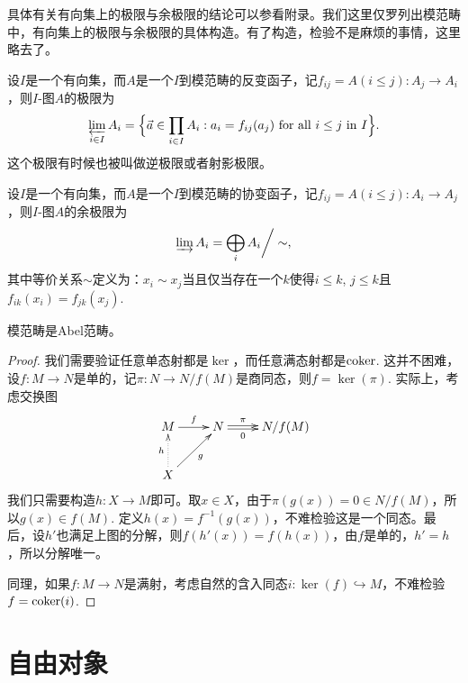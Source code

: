 \begin{para}[有向集上的极限与余极限]
具体有关有向集上的极限与余极限的结论可以参看附录。我们这里仅罗列出模范畴中，有向集上的极限与余极限的具体构造。有了构造，检验不是麻烦的事情，这里略去了。

设$I$是一个有向集，而$A$是一个$I$到模范畴的反变函子，记$f_{ij}=A(i\leq j):A_j\to A_i$，则$I$-图$A$的极限为
\[
	\varprojlim _{i\in I}A_{i}={\Big \{}{\vec {a}}\in \prod _{i\in I}A_{i}\;{:}\;a_{i}=f_{ij}(a_{j}){\text{ for all }}i\leq j{\text{ in }}I{\Big \}}.
\]
这个极限有时候也被叫做逆极限或者射影极限。

设$I$是一个有向集，而$A$是一个$I$到模范畴的协变函子，记$f_{ij}=A(i\leq j):A_i\to A_j$，则$I$-图$A$的余极限为
\[
	\varinjlim A_{i}=\bigoplus_{i}A_{i}{\bigg /}\sim,
\]
其中等价关系$\sim$定义为：$x_i\sim x_j$当且仅当存在一个$k$使得$i\leq k$, $j\leq k$且$f_{ik}(x_{i})=f_{jk}(x_{j})$.
\end{para}

\begin{thm}
模范畴是Abel范畴。
\end{thm}

\begin{proof}
我们需要验证任意单态射都是$\ker$，而任意满态射都是$\operatorname{coker}$. 这并不困难，设$f:M\to N$是单的，记$\pi:N\to N/f(M)$是商同态，则$f=\ker(\pi)$. 实际上，考虑交换图
\[
\begin{xy}
	\xymatrix{
		M\ar[r]^-{f}&N\ar@<0.3ex>[r]^-{\pi} \ar@<-0.3ex>[r]_-{0}&N/f(M)\\
		X\ar@{.>}[u]^-{h}\ar[ur]_-{g}
	}
\end{xy}
\]
我们只需要构造$h:X\to M$即可。取$x\in X$，由于$\pi (g(x))=0\in N/f(M)$，所以$g(x)\in f(M)$. 定义$h(x)=f^{-1}(g(x))$，不难检验这是一个同态。最后，设$h'$也满足上图的分解，则$f(h'(x))=f(h(x))$，由$f$是单的，$h'=h$，所以分解唯一。

同理，如果$f:M\to N$是满射，考虑自然的含入同态$i:\ker(f)\hookrightarrow M$，不难检验$f=\operatorname{coker}(i)$.
\end{proof}

\section{自由对象}


